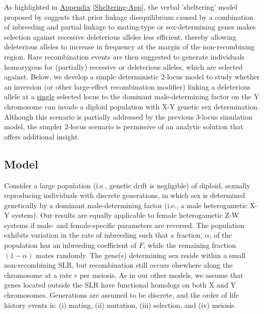 \documentclass{article}
\begin{document}
\begin{appendices}
As highlighted in \hyperref[Sheltering-App]{Appendix} \ref{Sheltering-App}, the verbal 'sheltering' model proposed by \citet{Branco2017} suggests that prior linkage disequilibrium caused by a combination of inbreeding and partial linkage to mating-type or sex-determining genes makes selection against recessive deleterious alleles less efficient, thereby allowing deleterious alleles to increase in frequency at the margin of the non-recombining region. Rare recombination events are then suggested to generate individuals homozygous for (partially) recessive or deleterious alleles, which are selected against. Below, we develop a simple deterministic 2-locus model to study whether an inversion (or other large-effect recombination modifier) linking a deleterious allele at a \underline{single} selected locus to the dominant male-determining factor on the Y chromosome can invade a diploid population with X-Y genetic sex determination. Although this scenario is partially addressed by the previous 3-locus simulation model, the simpler 2-locus scenario is permissive of an analytic solution that offers additional insight.

\subsection{Model}
Consider a large population (i.e., genetic drift is negligible) of diploid, sexually reproducing individuals with discrete generations, in which sex is determined genetically by a dominant male-determining factor (i.e., a male heterogametic X-Y system). Our results are equally applicable to female heterogametic Z-W systems if male- and female-specific parameters are reversed. The population exhibits variation in the rate of inbreeding such that a fraction, $\alpha$, of the population has an inbreeding coefficient of $F$, while the remaining fraction $(1-\alpha)$ mates randomly. The gene(s) determining sex reside within a small non-recombining SLR, but recombination still occurs elsewhere along the chromosome at a rate $r$ per meiosis. As in our other models, we assume that genes located outside the SLR have functional homologs on both X and Y chromosomes. Generations are assumed to be discrete, and the order of life history events is: (i) mating, (ii) mutation, (iii) selection, and (iv) meiosis. 


\end{appendices}
\end{document}
